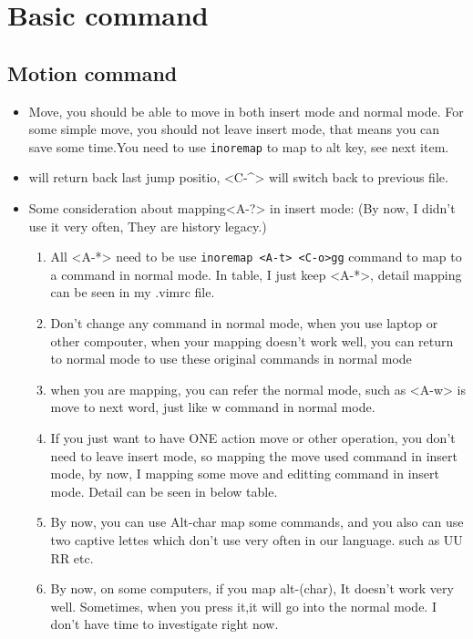\documentclass[a4paper,12pt,twoside]{book}
\begin{document}
\section{Basic command}
\subsection{Motion command}
	\begin{itemize}
	\item Move, you should be able to move in both insert mode and normal mode. For some simple move, you should not leave insert mode, that means you can save some time.You need to use \verb!inoremap! to map to alt key, see next item.  

	\item <C-o> will return back last jump positio, <C-\^{}> will switch back to previous file. 

	\item Some consideration about mapping<A-?> in insert mode: (By now, I didn't use it very often, They are history legacy.)
			\begin{enumerate}
					\item All <A-*> need to be use \verb!inoremap <A-t> <C-o>gg! command to map to a command in normal mode. In table, I just keep <A-*>, detail mapping can be seen in my .vimrc file. 

					\item Don't change any command in normal mode, when you use laptop or other compouter, when your mapping doesn't work well, you can return to normal mode to use these original commands in normal mode

					\item when you are mapping, you can refer the normal mode, such as <A-w> is move to next word, just like w command in normal mode.

					\item If you just want to have ONE action move or other operation, you don't need to leave insert mode, so mapping the move used command in insert mode, by now, I mapping some move and editting command in insert mode. Detail can be seen in below table.

					\item By now, you can use Alt-char map some commands, and you also can use two captive lettes which don't use very often in our language. such as UU RR etc. 

					\item By now, on some computers, if you map alt-(char), It doesn't work very well. Sometimes, when you press it,it will go into the normal mode. I don't have time to investigate right now. 
			\end{enumerate}


\end{itemize}
\end{document}
